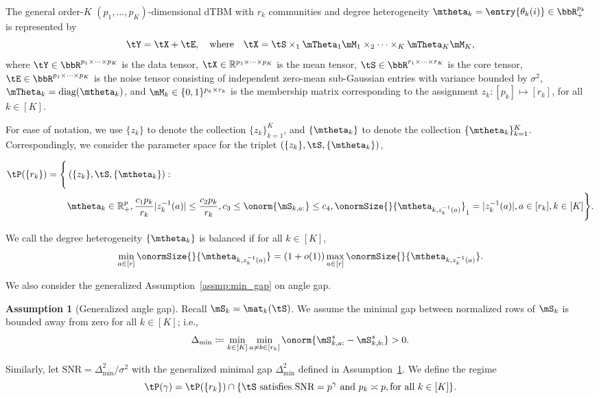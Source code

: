 \documentclass[lettersize,onecolumn,journal]{IEEEtran}
\theoremstyle{definition}
\theoremstyle{definition}
\newtheorem{assumption}{Assumption}
\newcommand{\of}[1]{\left(#1\right)}
\begin{document}
 The general order-$K$ $(p_1, \ldots, p_K)$-dimensional dTBM with $r_k$ communities and degree heterogeneity $\mtheta_k = \entry{\theta_k(i)} \in \bbR_+^{p_k}$ is represented by
\begin{equation}\label{eq:general_dtbm}
    \tY = \tX+ \tE,\quad \text{where}\quad \tX=\tS \times_1 \mTheta_1 \mM_1 \times_2 \cdots \times_K \mTheta_K \mM_K,
\end{equation}
where $\tY \in \bbR^{p_1 \times \cdots \times p_K}$ is the data tensor, $\tX\in \mathbb{R}^{p_1\times \cdots \times p_K}$ is the mean tensor, $\tS \in \bbR^{r_1 \times \cdots \times r_K}$ is the core tensor, $\tE \in \bbR^{p_1 \times \cdots \times p_K}$ is the noise tensor consisting of independent zero-mean sub-Gaussian entries with variance bounded by $\sigma^2$, $\mTheta_k = \text{diag}(\mtheta_k)$, and $\mM_k\in \{0,1\}^{p_k \times r_k}$ is the membership matrix corresponding to the assignment $z_k: [p_k] \mapsto [r_k]$, for all $k \in [K]$. 

For ease of notation, we use $\{z_k\}$ to denote the collection $\{z_k\}_{k=1}^K$, and $\{\mtheta_k\}$ to denote the collection $\{\mtheta_k\}_{k=1}^K$. Correspondingly, we consider the parameter space for the triplet $\of{\{z_k\}, \tS, \{\mtheta_k\}}$,

\begin{align}
 \tP(\{r_k\}) = \Bigg\{ &\of{\{z_k\}, \tS, \{\mtheta_k\}}:\\
   & \mtheta_k \in\mathbb{R}^p_{+}, {c_1 p_k\over r_k} |z_k^{-1}(a)| \leq {c_2 p_k\over r_k}, c_3 \leq  \onorm{\mS_{k,a:}} \leq c_4 ,\onormSize{}{\mtheta_{k,z_k^{-1}(a)}}_1=|z_k^{-1}(a)|, a \in [r_k], k\in[K]\Bigg\}. \label{eq:general_family}
\end{align}


We call the degree heterogeneity $\{\mtheta_k\}$ is balanced if for all $k \in [K]$,
\begin{equation}\label{eq:general_balanced}
    {\min_{a\in[r]} \onormSize{}{\mtheta_{k, z_k^{-1}(a)}}=\left(1+o(1)\right)\max_{a\in[r]}\onormSize{}{\mtheta_{k,z_k^{-1}(a)}}}.
\end{equation}

We also consider the generalized Assumption~\ref{assmp:min_gap} on angle gap.
\begin{assumption}[Generalized angle gap]\label{assmp:general_minimal_gap} Recall $\mS_k=\mat_k(\tS)$. We assume the minimal gap between normalized rows of $\mS_k$ is bounded away from zero for all $k\in[K]$; i.e.,
\begin{equation}
     \Delta_{\min} \coloneqq \min_{k \in [K]} \min_{a \neq b \in [r_k]} \onorm{ \mS_{k,a:}^s - \mS_{k, b:}^s } > 0.
\end{equation}
\end{assumption}
Similarly, let $\text{SNR} = \Delta_{\min}^2/\sigma^2$ with the generalized minimal gap $\Delta_{\min}^2$ defined in Assumption~\ref{assmp:general_minimal_gap}. We define the regime
\begin{equation}
    \tP(\gamma) = \tP (\{r_k\}) \cap\{\tS \text{ satisfies $\text{SNR} = p^{\gamma}$ and $p_k \asymp p, \text{for all }k \in [K]$} \}.
\end{equation}
\end{document}
